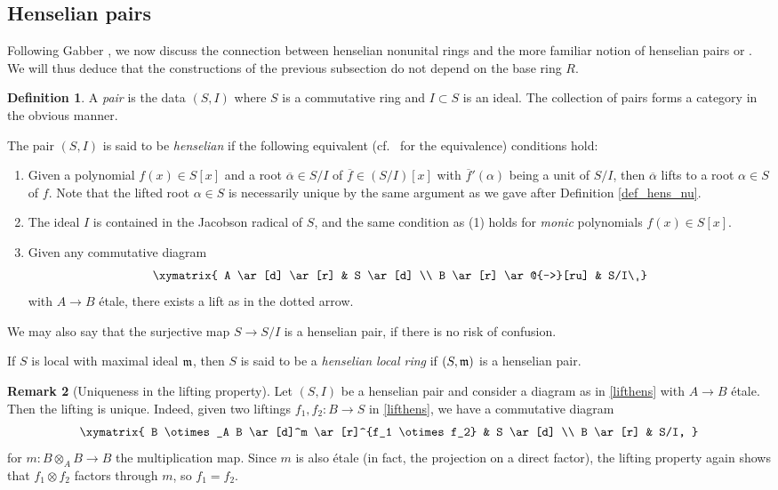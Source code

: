 \documentclass{amsart}
\theoremstyle{definition}
\newtheorem{definition}{Definition}[section]
\newtheorem{remark}[definition]{Remark}
\begin{document}
\subsection{Henselian pairs}
Following Gabber \cite{gabber}, we now discuss the connection between henselian nonunital rings and the more familiar notion of henselian pairs \cite[Tag
09XD]{stacks-project} or \cite[Ch.~XI]{Raynaud-henselian}. 
We will thus deduce that the constructions of the previous
subsection do not depend on the base ring $R$. 


\begin{definition} 
\label{def:henspair}
A \emph{pair} is the data $(S, I)$ where $S$ is a commutative ring and $I \subset S$ is
an ideal. The collection of pairs forms a category in the obvious
manner. 

The pair $(S, I)$ is said to be \emph{henselian} if the following equivalent
(cf.~\cite[Tag 09XD]{stacks-project} for the equivalence) conditions hold: 
\begin{enumerate}
\item  
Given a polynomial $f(x) \in S[x]$ and a root $\overline{\alpha} \in S/I$ of $\overline{f} \in (S/I)[x]$ with
$\overline{f}'(\alpha)$ being a unit of $S/I$, then $\overline \alpha$ lifts to a root $\alpha \in S$ of $f$.
Note that the lifted root $\alpha \in S$ is necessarily unique by the same argument as we gave after Definition \ref{def_hens_nu}.
\item The ideal $I$ is contained in the Jacobson radical of $S$, and the same
condition as (1) holds for \emph{monic} polynomials  $f(x) \in S[x]$. 
\item Given any commutative diagram
\begin{equation} \label{lifthens}  \xymatrix{
A \ar[d] \ar[r] &  S \ar[d]  \\
B \ar[r] \ar@{-->}[ru] &  S/I\
}\end{equation}
with $A \to B$ \'etale, there exists a lift as in the dotted arrow. 

\end{enumerate}
We may also say that the surjective map $S \to S/I$ is a henselian pair, if there is no risk
of confusion. 

If $S$ is local with maximal ideal $\frak m$, then $S$ is said
to be a \emph{henselian local ring} if $(S, \frak m)$ is a henselian pair. 
\end{definition} 


\begin{remark}[Uniqueness in the lifting property]
\label{uniquenessinliftingproperty}
Let $(S, I)$ be a henselian pair and consider a diagram as in 
\eqref{lifthens} with $A \to B$ \'etale. Then the lifting is unique. 
Indeed, given two liftings $f_1, f_2: B \to S$ in \eqref{lifthens}, we have a commutative diagram
\[ \xymatrix{
B \otimes_A B \ar[d]^m  \ar[r]^{f_1 \otimes f_2} &  S \ar[d]  \\
B  \ar[r] &  S/I,
}\]
for $m \colon B \otimes_A B \to B$ the multiplication map. 
Since $m$ is also \'etale (in fact, the projection on a direct factor), 
the lifting property again shows that $f_1 \otimes f_2$ factors through $m$, so
$f_1 = f_2$. 
\end{remark} 
\end{document}
